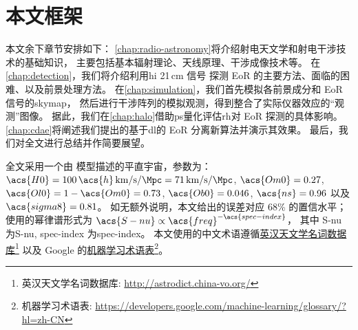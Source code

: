 \section{本文框架}

本文余下章节安排如下：
\autoref{chap:radio-astronomy}将介绍射电天文学和射电干涉技术的基础知识，
主要包括基本辐射理论、天线原理、干涉成像技术等。
在\autoref{chap:detection}，我们将介绍利用\ac{hi} 21\,cm 信号
探测 EoR 的主要方法、面临的困难、以及前景处理方法。
在\autoref{chap:simulation}，我们首先模拟各前景成分和 EoR 信号的\ac{skymap}，
然后进行干涉阵列的模拟观测，得到整合了实际仪器效应的\enquote{观测}图像。
据此，我们在\autoref{chap:halo}借助\ac{ps}量化评估\ac{rh}对
EoR 探测的具体影响。
\autoref{chap:cdae}将阐述我们提出的基于\ac{dl}的 EoR 分离新算法并演示其效果。
最后，我们对全文进行总结并作简要展望。

全文采用一个由 \lcdm 模型描述的平直宇宙，参数为：
$\acs{H0} = 100\,\acs{h}\,\si{\km\per\second\per\Mpc}
= \SI{71}{\km\per\second\per\Mpc}$,
$\acs{Om0} = 0.27$,
$\acs{Ol0} = 1 - \acs{Om0} = 0.73$,
$\acs{Ob0} = 0.046$,
$\acs{ns} = 0.96$ 以及 $\acs{sigma8} = 0.81$。
如无额外说明，本文给出的误差对应 68\% 的置信水平；
使用的幂律谱形式为 $\acs{S-nu} \propto \acs{freq}^{-\acs{spec-index}}$，
其中 \acs{S-nu} 为\acl{S-nu}, \acs{spec-index} 为\acl{spec-index}。
本文使用的中文术语遵循\href{%
  http://astrodict.china-vo.org/
}{英汉天文学名词数据库}\footnote{%
  英汉天文学名词数据库:
  \url{http://astrodict.china-vo.org/}}
以及 Google 的\href{%
  https://developers.google.com/machine-learning/glossary/?hl=zh-CN
}{机器学习术语表}\footnote{%
  机器学习术语表:
  \url{https://developers.google.com/machine-learning/glossary/?hl=zh-CN}}。


